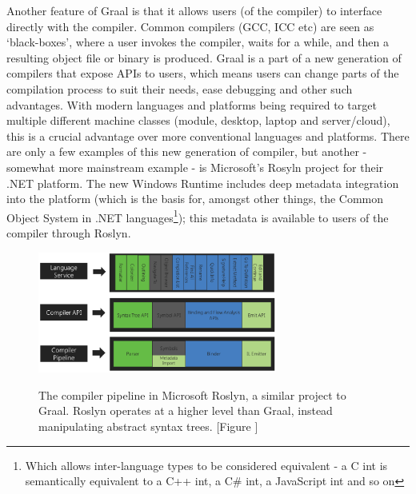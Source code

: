 Another feature of Graal is that it allows users (of the compiler) to interface directly with the compiler. Common compilers (GCC, ICC etc) are seen as `black-boxes', where a user invokes the compiler, waits for a while, and then a resulting object file or binary is produced. Graal is a part of a new generation of compilers that expose APIs to users, which means users can change parts of the compilation process to suit their needs, ease debugging and other such advantages. With modern languages and platforms being required to target multiple different machine classes (module, desktop, laptop and server/cloud), this is a crucial advantage over more conventional languages and platforms. There are only a few examples of this new generation of compiler, but another - somewhat more mainstream example - is Microsoft's Rosyln project \citep{RoslynProject} for their .NET platform. The new Windows Runtime includes deep metadata integration into the platform (which is the basis for, amongst other things, the Common Object System in .NET languages\footnote{Which allows inter-language types to be considered equivalent - a C int is semantically equivalent to a C++ int, a C\# int, a JavaScript int and so on}); this metadata is available to users of the compiler through Roslyn.

\begin{figure}
	\centering
	\includegraphics[width=0.7\textwidth]{graphics/roslyn-pipeline.pdf}
	\label{fig:roslyn-pipeline}
	\caption{The compiler pipeline in Microsoft Roslyn, a similar project to Graal. Roslyn operates at a higher level than Graal, instead manipulating abstract syntax trees. [Figure \citealp{RoslynProject}]}
\end{figure}

